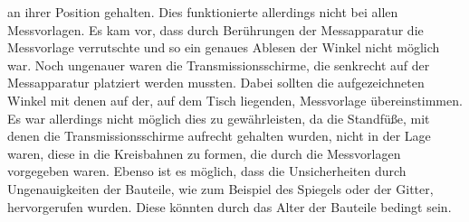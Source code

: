 an ihrer Position gehalten. Dies funktionierte allerdings nicht bei allen Messvorlagen. Es kam vor, dass durch Berührungen der Messapparatur die Messvorlage verrutschte und so
ein genaues Ablesen der Winkel nicht möglich war.
\newline
Noch ungenauer waren die Transmissionsschirme, die senkrecht auf der Messapparatur platziert werden mussten. Dabei sollten die aufgezeichneten Winkel mit denen auf der, auf dem
Tisch liegenden, Messvorlage übereinstimmen. Es war allerdings nicht möglich dies zu gewährleisten, da die Standfüße, mit denen die Transmissionsschirme aufrecht gehalten wurden,
nicht in der Lage waren, diese in die Kreisbahnen zu formen, die durch die Messvorlagen vorgegeben waren.
\newline
Ebenso ist es möglich, dass die Unsicherheiten durch Ungenauigkeiten der Bauteile, wie zum Beispiel des Spiegels oder der Gitter, hervorgerufen wurden. Diese könnten durch das
Alter der Bauteile bedingt sein.